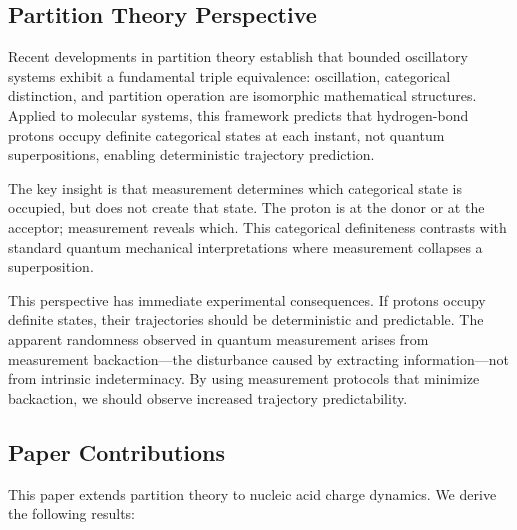 \documentclass[twocolumn,10pt]{article}
\theoremstyle{remark}
\begin{document}
\subsection{Partition Theory Perspective}

Recent developments in partition theory \citep{Sachikonye2025_Partition} establish that bounded oscillatory systems exhibit a fundamental triple equivalence: oscillation, categorical distinction, and partition operation are isomorphic mathematical structures. Applied to molecular systems, this framework predicts that hydrogen-bond protons occupy definite categorical states at each instant, not quantum superpositions, enabling deterministic trajectory prediction.

The key insight is that measurement determines which categorical state is occupied, but does not create that state. The proton is at the donor or at the acceptor; measurement reveals which. This categorical definiteness contrasts with standard quantum mechanical interpretations where measurement collapses a superposition.

This perspective has immediate experimental consequences. If protons occupy definite states, their trajectories should be deterministic and predictable. The apparent randomness observed in quantum measurement arises from measurement backaction---the disturbance caused by extracting information---not from intrinsic indeterminacy. By using measurement protocols that minimize backaction, we should observe increased trajectory predictability.

\subsection{Paper Contributions}

This paper extends partition theory to nucleic acid charge dynamics. We derive the following results:
\end{document}

